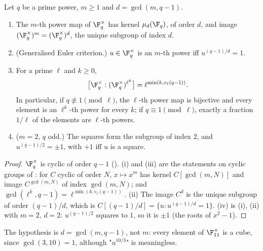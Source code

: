 \begin{theorem}\label{thm:rings:power-index}
Let $q$ be a prime power, $m\ge1$ and $d=\gcd(m,q-1)$.
\begin{enumerate}[label=(\roman*)]
\item The $m$-th power map of $\F_q^\times$ has kernel $\mu_d(\F_q)$, of order $d$, and image $(\F_q^\times)^m=(\F_q^\times)^d$, the unique subgroup of index $d$.
\item (Generalised Euler criterion.) $u\in\F_q^\times$ is an $m$-th power iff $u^{(q-1)/d}=1$.
\item For a prime $\ell$ and $k\ge0$,
\[
\bigl[\F_q^\times:(\F_q^\times)^{\ell^k}\bigr]=\ell^{\min(k,v_\ell(q-1))}.
\]
In particular, if $q\not\equiv1\pmod\ell$, the $\ell$-th power map is bijective and every element is an $\ell^k$-th power for every $k$; if $q\equiv1\pmod\ell$,
exactly a fraction $1/\ell$ of the elements are $\ell$-th powers.
\item ($m=2$, $q$ odd.) The squares form the subgroup of index $2$, and $u^{(q-1)/2}=\pm1$, with $+1$ iff $u$ is a square.
\end{enumerate}
\end{theorem}

\begin{proof}
$\F_q^\times$ is cyclic of order $q-1$ (). (i) and (iii) are the statements on cyclic groups of :
for $C$ cyclic of order $N$, $x\mapsto x^m$ has kernel $C[\gcd(m,N)]$ and image $C^{\gcd(m,N)}$ of index $\gcd(m,N)$; and $\gcd(\ell^k,q-1)=\ell^{\min(k,v_\ell(q-1))}$.
(ii) The image $C^d$ is the unique subgroup of order $(q-1)/d$, which is $C[(q-1)/d]=\{u:u^{(q-1)/d}=1\}$. (iv) is (i), (ii) with $m=2$, $d=2$: $u^{(q-1)/2}$
squares to $1$, so it is $\pm1$ (the roots of $x^2-1$).
\end{proof}

The hypothesis is $d=\gcd(m,q-1)$, not $m$: every element of $\F_{11}^\times$ is a cube, since $\gcd(3,10)=1$, although "$u^{10/3}$" is meaningless.

